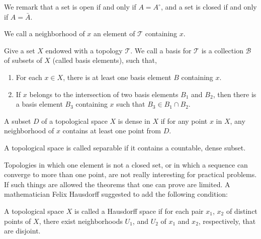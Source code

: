 We remark that a set is open if and only if $A=A^{\circ}$, and a set is closed if and only if $A=\bar{A}$.  


We call a neighborhood of $x$ an element of $\mathcal{T}$ containing $x$.
\begin{definition}
	Give a set $X$ endowed with a topology $\mathcal T$. We call a basis for $\mathcal{T}$ is a collection $\mathcal{B}$ of subsets of $X$ (called basis elements), such that,
	\begin{enumerate}
		\item  For each $x\in X$, there is at least one basis element $B$ containing $x$. 
		\item  If $x$ belongs to the intersection of two basis elements $B_1$ and $B_2$, then there is a basis element $B_3$ containing $x$ such that $B_3 \in B_1 \cap B_2$. 
	\end{enumerate}
\end{definition}



\begin{definition}
	A subset $D$ of a topological space $X$ is dense in $X$ if for any point $x$ in $X$, any neighborhood of $x$ contains at least one point from $D$.
\end{definition}

\begin{definition}
	A topological space is called separable if it contains a countable, dense subset.
\end{definition}

Topologies in which one element is not a closed set, or in which a sequence can converge to more than one point, are not really interesting for practical problems. If such things are allowed the theorems that one can prove are limited. A mathematician Felix Hausdorff suggested to add the following condition:
  
\begin{definition}
A topological space $X$ is called a Hausdorff space if for each pair $x_1$, $x_2$ of distinct points of $X$, there exist neighborhoods $U_1$, and $U_2$ of $x_1$ and $x_2$, respectively, that are disjoint. 
\end{definition}

\begin{definition}[Distance]
\end{definition}
\begin{definition}
	
\end{definition}

